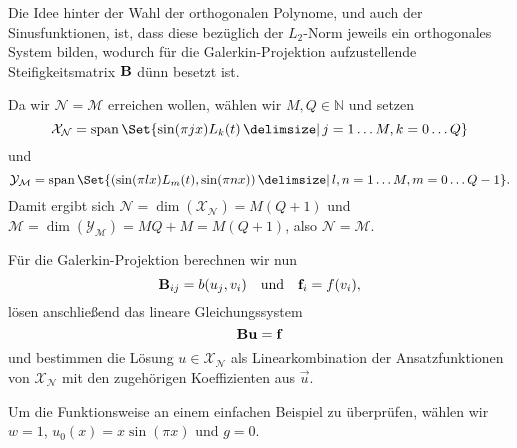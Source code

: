 Die Idee hinter der Wahl der orthogonalen Polynome, und auch der Sinusfunktionen, ist, dass diese bezüglich der $L_{2}$-Norm jeweils ein orthogonales System bilden, wodurch für die Galerkin-Projektion aufzustellende Steifigkeitsmatrix $\mathbf{B}$ dünn besetzt ist.

Da wir $\mathcal N = \mathcal M$ erreichen wollen, wählen wir $M, Q \in \mathbb{N}$ und setzen
\begin{equation}
    \mathcal X_{\mathcal N} = \spn\Set{ \sin(\pi j x) L_{k}(t) \given j = 1 \dots M, k = 0 \dots Q }
\end{equation}
und
\begin{equation}
    \mathcal Y_{\mathcal M} = \spn\Set{ (\sin(\pi l x) L_{m}(t), \sin(\pi n x)) \given l, n = 1 \dots M, m = 0 \dots Q - 1 }.
\end{equation}
Damit ergibt sich $\mathcal N = \dim(\mathcal X_{\mathcal N}) = M (Q + 1)$ und $\mathcal M = \dim(\mathcal Y_{\mathcal M}) = M Q + M = M ( Q + 1 )$, also $\mathcal N = \mathcal M$.

Für die Galerkin-Projektion berechnen wir nun
\begin{equation}
    \mathbf{B}_{ij} = b(u_{j}, v_{i}) \quad\text{und}\quad \mathbf{f}_{i} = f(v_{i}),
\end{equation}
lösen anschließend das lineare Gleichungssystem
\begin{equation}
    \mathbf{B} \mathbf{u} = \mathbf{f}
\end{equation}
und bestimmen die Lösung $u \in \mathcal X_{\mathcal N}$ als Linearkombination der Ansatzfunktionen von $\mathcal X_{\mathcal N}$ mit den zugehörigen Koeffizienten aus $\vec u$.

Um die Funktionsweise an einem einfachen Beispiel zu überprüfen, wählen wir $w = 1$, $u_{0}(x) = x \sin(\pi x)$ und $g = 0$.



